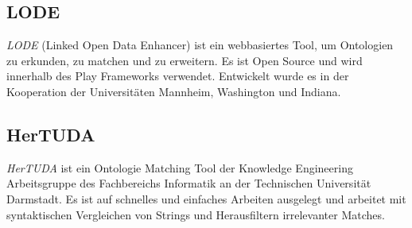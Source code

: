 		\subsection{LODE}
		\textit{LODE} (Linked Open Data Enhancer) ist ein webbasiertes Tool, um
		Ontologien zu erkunden, zu matchen und zu erweitern. Es ist Open Source  und wird innerhalb des Play Frameworks   verwendet. Entwickelt wurde es in der Kooperation der Universitäten Mannheim, Washington und Indiana.
		
		\subsection{HerTUDA}
		\textit{HerTUDA} ist ein Ontologie Matching Tool der Knowledge Engineering
		Arbeitsgruppe des Fachbereichs Informatik an der Technischen Universität Darmstadt. Es ist auf schnelles und einfaches Arbeiten ausgelegt und arbeitet mit syntaktischen Vergleichen von Strings und Herausfiltern irrelevanter Matches.
